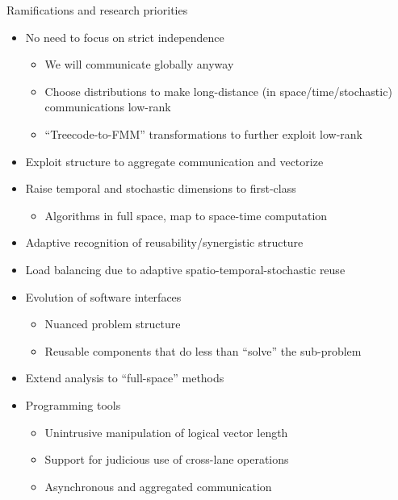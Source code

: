 \documentclass{beamer}
\begin{document}
\begin{frame}{Ramifications and research priorities}
  \begin{itemize}
  \item No need to focus on strict independence
    \begin{itemize}
    \item We will communicate globally anyway
    \item Choose distributions to make long-distance (in space/time/stochastic) communications low-rank
    \item ``Treecode-to-FMM'' transformations to further exploit low-rank
    \end{itemize}
  \item Exploit structure to aggregate communication and vectorize
  \item Raise temporal and stochastic dimensions to first-class
    \begin{itemize}
    \item Algorithms in full space, map to space-time computation
    \end{itemize}
  \item Adaptive recognition of reusability/synergistic structure
  \item Load balancing due to adaptive spatio-temporal-stochastic reuse
  \item Evolution of software interfaces
    \begin{itemize}
    \item Nuanced problem structure
    \item Reusable components that do less than ``solve'' the sub-problem
    \end{itemize}
  \item Extend analysis to ``full-space'' methods
  \item Programming tools
    \begin{itemize}
    \item Unintrusive manipulation of logical vector length
    \item Support for judicious use of cross-lane operations
    \item Asynchronous and aggregated communication
    \end{itemize}
  \end{itemize}
\end{frame}
\end{document}
